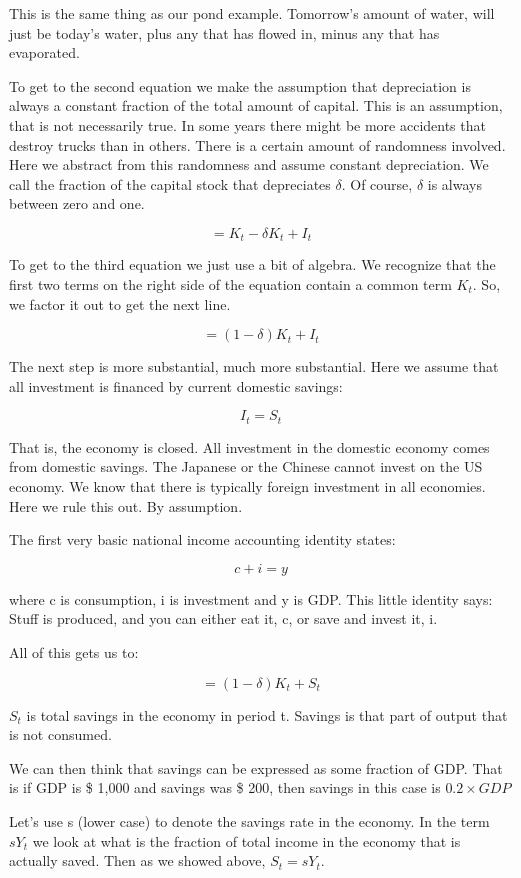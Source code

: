 \documentclass[
]{book}
\begin{document}
This is the same thing as our pond example. Tomorrow's amount of water, will just be today's water, plus any that has flowed in, minus any that has evaporated.

To get to the second equation we make the assumption that depreciation is always a constant fraction of the total amount of capital. This is an assumption, that is not necessarily true. In some years there might be more accidents that destroy trucks than in others. There is a certain amount of randomness involved. Here we abstract from this randomness and assume constant depreciation. We call the fraction of the capital stock that depreciates \(\delta\). Of course, \(\delta\) is always between zero and one.

\[=K_t- \delta K_t+I_t\]

To get to the third equation we just use a bit of algebra. We recognize that the first two terms on the right side of the equation contain a common term \(K_t\). So, we factor it out to get the next line.

\[=(1-\delta) K_t+I_t\]

The next step is more substantial, much more substantial. Here we assume that all investment is financed by current domestic savings:

\[I_t=S_t\]

That is, the economy is closed. All investment in the domestic economy comes from domestic savings. The Japanese or the Chinese cannot invest on the US economy. We know that there is typically foreign investment in all economies. Here we rule this out. By assumption.

The first very basic national income accounting identity states:

\[c + i = y\]

where c is consumption, i is investment and y is GDP. This little identity says: Stuff is produced, and you can either eat it, c, or save and invest it, i.

All of this gets us to:

\[=(1-\delta)K_t+S_t\]

\(S_t\) is total savings in the economy in period t. Savings is that part of output that is not consumed.

We can then think that savings can be expressed as some fraction of GDP. That is if GDP is \$ 1,000 and savings was \$ 200, then savings in this case is \(0.2 \times GDP\)

Let's use s (lower case) to denote the savings rate in the economy. In the term \(sY_t\) we look at what is the fraction of total income in the economy that is actually saved. Then as we showed above, \(S_t=sY_t\).
\end{document}
